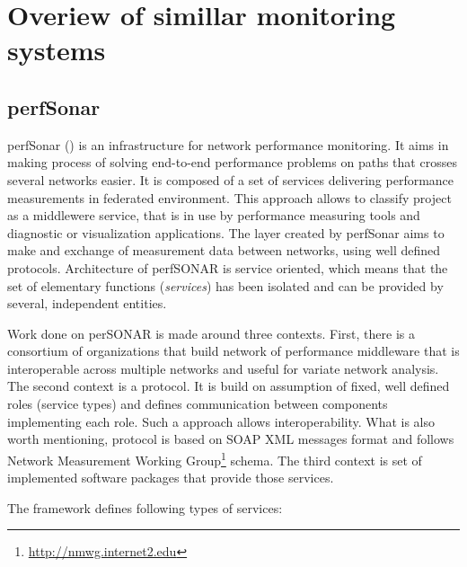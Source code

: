 %
 
 
\section{Overiew of simillar monitoring systems}
\label{sec:ch2_similar}


\subsection{perfSonar}

perfSonar (\cite{perfSonar1,perfSonar2,perfSonar3}) is an infrastructure for network performance monitoring. It aims in making process of
solving end-to-end performance problems on paths that crosses several networks easier. It is composed of a set of services delivering
performance measurements in federated environment. This approach allows to classify project as a middlewere service, that is in use by
performance measuring tools and diagnostic or visualization applications. The layer created by perfSonar aims to make and exchange of 
measurement data between networks, using well defined protocols.  Architecture of perfSONAR is service oriented, which means that the
set of elementary functions (\emph{services}) has been isolated and can be provided by several, independent entities.

Work done on perSONAR is made around three contexts. First, there is a consortium of organizations that build network of performance
middleware that is interoperable across multiple networks and useful for variate network analysis. The second context is a protocol. It is build on
assumption of fixed, well defined roles (service types) and defines communication between components implementing each role. Such a approach
allows interoperability. What is also worth mentioning, protocol is based on SOAP XML messages format and follows Network
Measurement Working Group\footnote{\url{http://nmwg.internet2.edu}} schema.  The third context is set of implemented software packages that
provide those services.

The framework defines following types of services:

